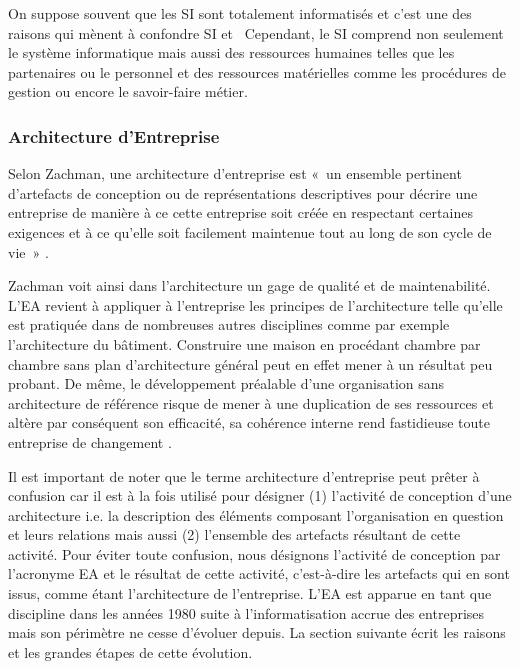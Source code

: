On suppose souvent que les SI sont totalement informatisés et c'est une des 
raisons qui mènent à confondre SI et \ Cependant, le SI comprend non seulement 
le système informatique mais aussi des ressources humaines telles que les 
partenaires ou le personnel et des ressources matérielles comme les procédures 
de gestion ou encore le savoir-faire métier.

\subsubsection{Architecture d'Entreprise}

Selon Zachman, une architecture d'entreprise est «~un ensemble pertinent 
d'artefacts de conception ou de représentations descriptives pour décrire une 
entreprise de manière à ce cette entreprise soit créée en respectant certaines 
exigences et à ce qu'elle soit facilement maintenue tout au long de son cycle de 
vie~» \cite{zachman1997enterprise}. 

Zachman voit ainsi dans l'architecture un gage de qualité et de maintenabilité. 
L'EA revient à appliquer à l'entreprise les principes de l'architecture telle 
qu'elle est pratiquée dans de nombreuses autres disciplines comme par exemple 
l'architecture du bâtiment. Construire une maison en procédant chambre par 
chambre sans plan d'architecture général peut en effet mener à un résultat peu 
probant. De même, le développement préalable d'une organisation sans 
architecture de référence risque de mener à une duplication de ses ressources et 
altère par conséquent son efficacité, sa cohérence interne rend fastidieuse 
toute entreprise de changement \cite{zachman1997enterprise} 
\cite{bernard2012introduction}. 

Il est important de noter que le terme architecture d'entreprise peut prêter à 
confusion car il est à la fois utilisé pour désigner (1) l'activité de 
conception d'une architecture i.e. la description des éléments composant 
l'organisation en question et leurs relations mais aussi (2) l'ensemble des 
artefacts résultant de cette activité. Pour éviter toute confusion, nous 
désignons l'activité de conception par l'acronyme EA et le résultat de cette 
activité, c'est-à-dire les artefacts qui en sont issus, comme étant 
l'architecture de l'entreprise. L'EA est apparue en tant que discipline dans 
les années 1980 suite à l'informatisation accrue des entreprises mais son 
périmètre ne cesse d'évoluer depuis. La section suivante écrit les raisons et 
les grandes étapes de cette évolution. 


